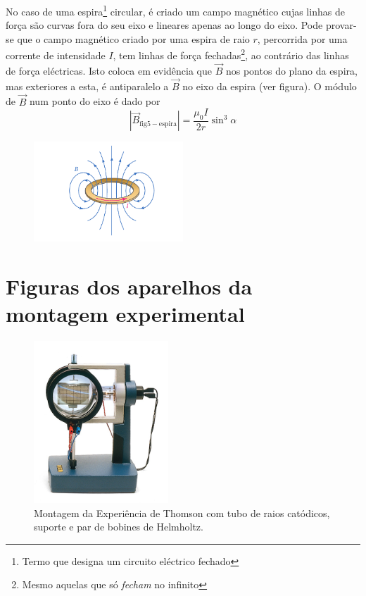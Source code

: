 \documentclass[a4paper,twoside,12pt]{article}      %
\begin{document}
%


%
No caso de uma espira\footnote{Termo que designa um circuito eléctrico fechado} circular, é criado um campo magnético cujas linhas de força são curvas fora do seu eixo e lineares apenas ao longo do eixo. Pode provar-se que o campo magnético criado por uma espira de raio $r$, percorrida por uma corrente de intensidade $I$, tem linhas de força fechadas\footnote{Mesmo aquelas que só \emph{fecham} no infinito}, ao contrário das linhas de força eléctricas. Isto coloca em evidência que $\vec{B}$ nos pontos do plano da espira, mas exteriores a esta, é antiparalelo a $\vec{B}$ no eixo da espira (ver figura). O módulo de $\vec{B}$ num ponto do eixo é dado por
\begin{equation}
	|\vec{B}_{\mathrm{fig5-espira}}| = \frac{\mu_0 I}{2 r} \sin^3 \alpha
\end{equation}

 \begin{figure}[h]
  \centering 
\includegraphics[width=0.5\textwidth]{fig-espira.pdf}
\end{figure}


\newpage
\section{Figuras dos aparelhos da montagem experimental}
\begin{figure}
	[htb]  \centering 
	\includegraphics[width=0.45\textwidth]{./fig3-ThomsomEquip}
	\caption{Montagem da Experiência de Thomson com tubo de raios catódicos, suporte e par de bobines de Helmholtz. \label{fig:Thomson_Equip}} 
\end{figure}
\end{document}

